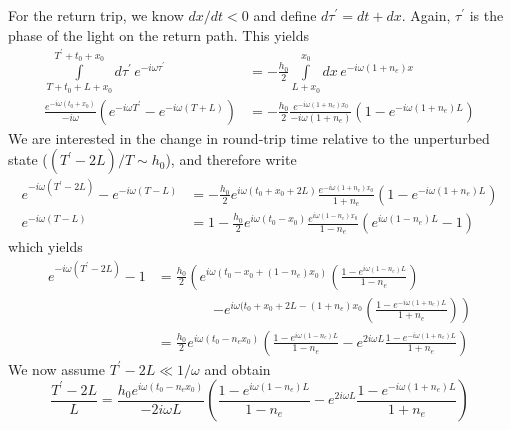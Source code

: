 \documentclass{article}
\begin{document}
For the return trip, we know $dx/dt < 0$ and define $d\tau^\prime = dt + dx$.
Again, $\tau^\prime$ is the phase of the light on the return path.
This yields
\begin{align}
    \int\limits_{T+t_0+L+x_0}^{T^\prime+t_0+x_0} d\tau^\prime\, e^{-i\omega\tau^\prime} & = -\frac{h_0}{2} \int\limits_{L+x_0}^{x_0} dx\, e^{-i\omega(1+n_e)x} \\
    \frac{e^{-i\omega(t_0+x_0)}}{-i\omega}\left(e^{-i\omega T^\prime} - e^{-i\omega(T+L)}\right) & = - \frac{h_0}{2} \frac{e^{-i\omega(1+n_e)x_0}}{-i\omega(1+n_e)}\left( 1 - e^{-i\omega(1+n_e)L}\right)
\end{align}
We are interested in the change in round-trip time relative to the unperturbed state ($(T^\prime - 2L)/T \sim h_0$), and therefore write
\begin{align}
    e^{-i\omega(T^\prime-2L)} - e^{-i\omega(T-L)} & = -\frac{h_0}{2} e^{i\omega(t_0+x_0+2L)} \frac{e^{-i\omega(1+n_e)x_0}}{1+n_e}\left(1-e^{-i\omega(1+n_e)L}\right) \\
    e^{-i\omega(T-L)} & = 1 - \frac{h_0}{2}e^{i\omega(t_0-x_0)}\frac{e^{i\omega(1-n_e)x_0}}{1-n_e}\left(e^{i\omega(1-n_e)L} - 1\right)
\end{align}
which yields
\begin{align}
    e^{-i\omega(T^\prime-2L)} - 1 & = \frac{h_0}{2}\left( e^{i\omega(t_0-x_0 + (1-n_e)x_0)}\left(\frac{1-e^{i\omega(1-n_e)L}}{1-n_e}\right) \right. \\
                                  & \quad \quad \quad \quad \left. - e^{i\omega(t_0+x_0+2L - (1+n_e)x_0} \left(\frac{1-e^{-i\omega(1+n_e)L}}{1+n_e}\right) \right) \\
                                  & = \frac{h_0}{2} e^{i\omega(t_0-n_ex_0)} \left( \frac{1-e^{i\omega(1-n_e)L}}{1-n_e} - e^{2i\omega L}\frac{1-e^{-i\omega(1+n_e)L}}{1+n_e} \right)
\end{align}
We now assume $T^\prime - 2L \ll 1/\omega$ and obtain
\begin{equation}
    \frac{T^\prime - 2L}{L} = \frac{h_0 e^{i\omega(t_0-n_ex_0)}}{-2i\omega L} \left(\frac{1-e^{i\omega(1-n_e)L}}{1-n_e} - e^{2i\omega L}\frac{1-e^{-i\omega(1+n_e)L}}{1+n_e} \right)
\end{equation}
\end{document}
